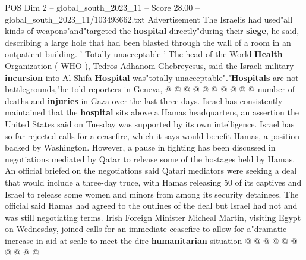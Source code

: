 \begin{textsample}{POS Dim 2 – global\_south\_2023\_11 – Score 28.00 – global\_south\_2023\_11/103493662.txt}
Advertisement The Israelis had used"all kinds of weapons"and"targeted the \textbf{hospital} directly"during their \textbf{siege}, he said, describing a large hole that had been blasted through the wall of a room in an outpatient building. ' Totally unacceptable ' The head of the World \textbf{Health} Organization ( WHO ), Tedros Adhanom Ghebreyesus, said the Israeli military \textbf{incursion} into Al Shifa \textbf{Hospital} was"totally unacceptable"."\textbf{Hospitals} are not battlegrounds,"he told reporters in Geneva, @ @ @ @ @ @ @ @ @ @ number of deaths and \textbf{injuries} in Gaza over the last three days.
Israel has consistently maintained that the \textbf{hospital} sits above a Hamas headquarters, an assertion the United States said on Tuesday was supported by its own intelligence.
Israel has so far rejected calls for a ceasefire, which it says would benefit Hamas, a position backed by Washington.
However, a pause in fighting has been discussed in negotiations mediated by Qatar to release some of the hostages held by Hamas.
An official briefed on the negotiations said Qatari mediators were seeking a deal that would include a three-day truce, with Hamas releasing 50 of its captives and Israel to release some women and minors from among its security detainees.
The official said Hamas had agreed to the outlines of the deal but Israel had not and was still negotiating terms.
Irish Foreign Minister Micheal Martin, visiting Egypt on Wednesday, joined calls for an immediate ceasefire to allow for a"dramatic increase in aid at scale to meet the dire \textbf{humanitarian} situation @ @ @ @ @ @ @ @ @ @

\end{textsample}
